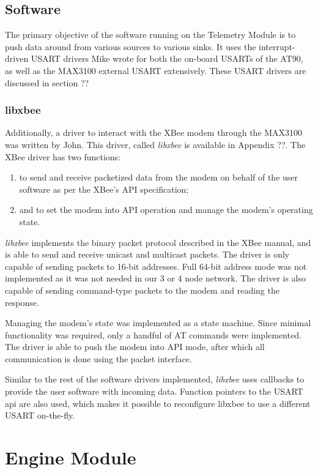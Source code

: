 \documentclass[a4paper,10pt]{scrreprt}
\begin{document}
\section{Software}

The primary objective of the software running on the Telemetry Module is to push data around from various sources to various sinks. It uses the interrupt-driven USART drivers Mike wrote for both the on-board USARTs of the AT90, as well as the MAX3100 external USART extensively. These USART drivers are discussed in section ?? %

\subsection{libxbee}

Additionally, a driver to interact with the XBee modem through the MAX3100 was written by John. This driver, called \emph{libxbee} is available in Appendix ??. The XBee driver has two functions:
\begin{enumerate}
 \item to send and receive packetized data from the modem on behalf of the user software as per the XBee's API specification; %
 \item and to set the modem into API operation and manage the modem's operating state.
\end{enumerate}

\emph{libxbee} implements the binary packet protocol described in the XBee manual, and is able to send and receive unicast and multicast packets. The driver is only capable of sending packets to 16-bit addresses. Full 64-bit address mode was not implemented as it was not needed in our 3 or 4 node network. The driver is also capable of sending command-type packets to the modem and reading the response.

Managing the modem's state was implemented as a state machine. Since minimal functionality was required, only a handful of AT commands were implemented. The driver is able to push the modem into API mode, after which all communication is done using the packet interface.

Similar to the rest of the software drivers implemented, \emph{libxbee} uses callbacks to provide the user software with incoming data. Function pointers to the USART api are also used, which makes it possible to reconfigure libxbee to use a different USART on-the-fly.

\chapter{Engine Module}
\label{chap:engine}
\end{document}

